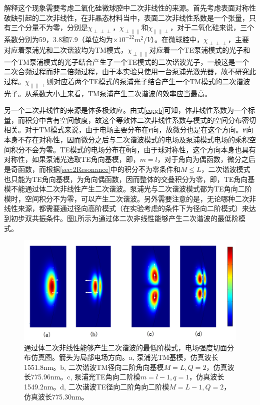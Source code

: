 \documentclass[UTF8,a4paper,cs4size,hyperref]{ctexart}
\begin{document}
解释这个现象需要考虑二氧化硅微球腔中二次非线性的来源。首先考虑表面对称性破缺引起的二次非线性，在非晶态材料当中，表面二次非线性系数是一个张量，只有三个分量不为零，分别是$\chi_{\perp \perp \perp}$，$\chi_{\perp \parallel \parallel}$和$\chi_{\parallel \parallel \perp}$，对于二氧化硅来说，三个系数分别为59，3.8和7.9（单位均为$\times 10^{-22} m^2/V$）。在微球腔中，$\chi_{\perp \perp \perp}$，主要对应着泵浦光和二次谐波均为TM模式，$\chi_{\perp \parallel \parallel}$对应着一个TE泵浦模式的光子和一个TM泵浦模式的光子结合产生了一个TE模式的二次谐波光子，一般这是一个二次合频过程而非二倍频过程，由于本实验只使用一台泵浦光激光器，故不研究此过程。$\chi_{\parallel \parallel \perp}$则对应着两个TE模式的泵浦光子结合产生一个TM模式的二次谐波光子。从系数大小上来看，TM泵浦产生二次谐波的效率应当最高。

另一个二次非线性的来源是体多极效应。由式\ref{eq:gb}可知，体非线性系数为一个标量，而积分中含有空间散度，故这个等效体二次非线性系数与模式的空间分布密切相关。对于TM模式来说，由于电场主要分布在$\mathbf{\hat{r}} $向，故微分也是在这个方向。$\mathbf{\hat{r}} $向本身不存在对称性，因而微分之后与二次谐波模式的电场及泵浦模式电场的乘积空间积分不会为零。TE模式的电场分布在$\mathbf{\hat{\theta}} $向，由于球对称性，这个方向本身也具有对称性，如果泵浦光选取TE角向基模，即，$m=l$，对于角向为偶函数，微分之后是奇函数，而根据\ref{sec:2Resonance}中的积分不为零条件和$M\le L$，二次谐波模式也只能为TE角向基模，为角向偶函数，因而整体的交叠积分为零，即，TE角向基模不能通过体二次非线性产生二次谐波。泵浦光与二次谐波模式都为TE角向二阶模时，空间积分不为零，可以产生二次谐波。另外需要注意的是，无论哪种二次非线性来源，都需要通过径向高阶模式（在实验考虑的条件下为径向二阶模式）来达到初步双共振条件。图\ref{pic:TM1zoomwarrow_1_9319}所示为通过体二次非线性能够产生二次谐波的最低阶模式。

\begin{figure}
\centering
\includegraphics[width=14cm ]{TM1zoomwarrow_1_9319}
\caption{通过体二次非线性能够产生二次谐波的最低阶模式，电场强度切面分布仿真图。箭头为局部电场方向。a, 泵浦光TM基模，仿真波长1551.8nm。b, 二次谐波TM径向二阶角向基模$M=L, Q=2$，仿真波长775.96nm。c, 泵浦光TE角向二阶模$m=l-1, q=1$，仿真波长1549.2nm。d, 二次谐波TE径向二阶角向二阶模$M=L-1, Q=2$，仿真波长775.30nm。}
\label{pic:TM1zoomwarrow_1_9319}
\end{figure}
\end{document}

